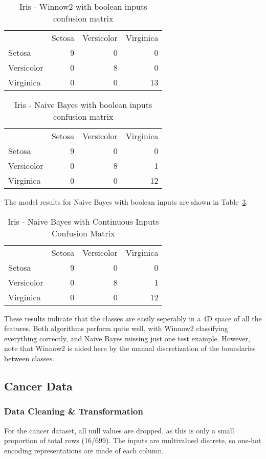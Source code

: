 \documentclass{amsart}
\begin{document}
    \begin{table}
    \begin{tabular}{lrrr}
    {} &  Setosa &  Versicolor &   Virginica \\
    Setosa &  9 &  0 &   0 \\
    Versicolor &  0 &  8 &   0 \\
    Virginica &  0 &  0 &  13
    \end{tabular}
    \caption{Iris - Winnow2 with boolean inputs confusion matrix}
    \label{iris_winnow2}
    \end{table}
    \begin{table}
    \begin{tabular}{lrrr}
    {} &  Setosa &  Versicolor &   Virginica \\
    Setosa &  9 &  0 &   0 \\
    Versicolor &  0 &  8 &   1 \\
    Virginica &  0 &  0 &  12
    \end{tabular}
    \caption{Iris - Naive Bayes with boolean inputs confusion matrix}
    \label{iris_nb_bool}
    \end{table}

    The model results for Naive Bayes with boolean inputs are shown in Table~\ref{iris_nb}.
    \begin{table}
    \begin{tabular}{lrrr}
{} &  Setosa &  Versicolor &   Virginica \\
    Setosa &  9 &  0 &   0 \\
    Versicolor &  0 &  8 &   1 \\
    Virginica &  0 &  0 &  12
    \end{tabular}
    \caption{Iris - Naive Bayes with Continuous Inputs Confusion Matrix}
    \label{iris_nb}
    \end{table}
These results indicate that the classes are easily seperably in a 4D space of all the features. Both algorithms
perform quite well, with Winnow2 classifying everything correctly, and Naive Bayes missing just one test example.
However, note that Winnow2 is aided here by the manual discretization of the boundaries between classes.

\subsection{Cancer Data}
    \subsubsection*{Data Cleaning \& Transformation}
    For the cancer dataset\cite{cancerdataset}, all null values are dropped, as this is only a small proportion of total rows (16/699).
    The inputs are multivalued discrete, so one-hot encoding representations are made of each column.
\end{document}
